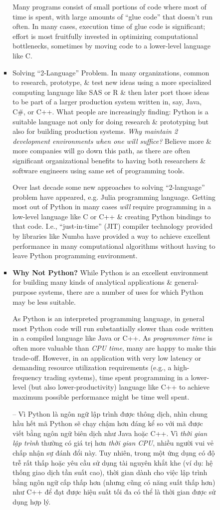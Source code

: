 \documentclass{article}
\begin{document}
\begin{enumerate}
\begin{itemize}
\begin{itemize}
\begin{itemize}
				Many programs consist of small portions of code where most of time is spent, with large amounts of ``glue code'' that doesn't run often. In many cases, execution time of glue code is significant; effort is most fruitfully invested in optimizing computational bottlenecks, sometimes by moving code to a lower-level language like C.
				\item {\sf Solving ``2-Language'' Problem.} In many organizations, common to research, prototype, \& test new ideas using a more specialized computing language like SAS or R \& then later port those ideas to be part of a larger production system written in, say, Java, C\#, or C++. What people are increasingly finding: Python is a suitable language not only for doing research \& prototyping but also for building production systems. {\it Why maintain 2 development environments when one will suffice?} Believe more \& more companies will go down this path, as there are often significant organizational benefits to having both researchers \& software engineers using same set of programming tools.
				
				Over last decade some new approaches to solving ``2-language'' problem have appeared, e.g. Julia programming language. Getting most out of Python in many cases {\it will} require programming in a low-level language like C or C++ \& creating Python bindings to that code. I.e., ``just-in-time'' (JIT) compiler technology provided by libraries like Numba have provided a way to achieve excellent performance in many computational algorithms without having to leave Python programming environment.
				\item {\bf Why Not Python?} While Python is an excellent environment for building many kinds of analytical applications \& general-purpose systems, there are a number of uses for which Python may be less suitable.
				
				As Python is an interpreted programming language, in general most Python code will run substantially slower than code written in a compiled language like Java or C++. As {\it programmer time} is often more valuable than {\it CPU time}, many are happy to make this trade-off. However, in an application with very low latency or demanding resource utilization requirements (e.g., a high-frequency trading systems), time spent programming in a lower-level (but also lower-productivity) language like C++ to achieve maximum possible performance might be time well spent.
				
				-- Vì Python là ngôn ngữ lập trình được thông dịch, nhìn chung hầu hết mã Python sẽ chạy chậm hơn đáng kể so với mã được viết bằng ngôn ngữ biên dịch như Java hoặc C++. Vì {\it thời gian lập trình} thường có giá trị hơn {\it thời gian CPU}, nhiều người vui vẻ chấp nhận sự đánh đổi này. Tuy nhiên, trong một ứng dụng có độ trễ rất thấp hoặc yêu cầu sử dụng tài nguyên khắt khe (ví dụ: hệ thống giao dịch tần suất cao), thời gian dành cho việc lập trình bằng ngôn ngữ cấp thấp hơn (nhưng cũng có năng suất thấp hơn) như C++ để đạt được hiệu suất tối đa có thể là thời gian được sử dụng hợp lý.
				

\end{itemize}
\end{itemize}
\end{itemize}
\end{enumerate}
\end{document}
